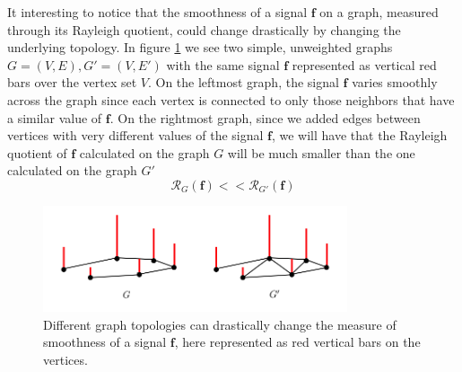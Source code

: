\begin{remark}
	It interesting to notice that the smoothness of a signal $\mathbf f$ on a graph, measured through its Rayleigh quotient, could change drastically by changing the underlying topology. In figure \ref{fig:graph} we see two simple, unweighted graphs $G=(V, E), G' =(V, E')$ with the same signal $\mathbf f$ represented as vertical red bars over the vertex set $V$. On the leftmost graph, the signal $\mathbf f$ varies smoothly across the graph since each vertex is connected to only those neighbors that have a similar value of $\mathbf f$. On the rightmost graph, since we added edges between vertices with very different values of the signal $\mathbf f$, we will have that the Rayleigh quotient of $\mathbf f$ calculated on the graph $G$ will be much smaller than the one calculated on the graph $G'$
	$$
	\mathcal R_{G}(\mathbf f) << \mathcal R_{G'}(\mathbf f)
	$$
\end{remark}
\begin{figure}
	\centering
	\includegraphics[width=0.8\textwidth]{figs/chapter1/graph.png}
	\caption{\label{fig:graph}Different graph topologies can drastically change the measure of smoothness of a signal $\mathbf f$, here represented as red vertical bars on the vertices.}
\end{figure}

